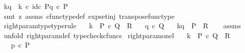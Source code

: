 \begin{isabellebody}
\ {\isachardoublequoteopen}k\isactrlbsub {\isacharbrackleft}{\kern0pt}{\isacharminus}{\kern0pt}{\isacharcomma}{\kern0pt}q{\isacharbrackright}{\kern0pt}\isactrlesub \ {\isasymequiv}\ k\ {\isasymcirc}\isactrlsub c\ {\isasymlangle}id\isactrlsub c\ P{\isacharcomma}{\kern0pt}q\ {\isasymcirc}\isactrlsub c\ {\isasymbeta}\isactrlbsub P\isactrlesub {\isasymrangle}{\isachardoublequoteclose}\isanewline
\ \ \ \ \isamarkupfalse%
\ {\isacharparenleft}{\kern0pt}smt\ {\isacharparenleft}{\kern0pt}z{}{\isacharparenright}{\kern0pt}\ assms\ cfunc{\isacharunderscore}{\kern0pt}type{\isacharunderscore}{\kern0pt}def\ exp{\isacharunderscore}{\kern0pt}set{\isacharunderscore}{\kern0pt}inj\ transpose{\isacharunderscore}{\kern0pt}func{\isacharunderscore}{\kern0pt}type{\isacharparenright}{\kern0pt}\isanewline
{}\isamarkupfalse%
%
\endisatagproof
{\isafoldproof}%
%
\isadelimproof
\isanewline
%
\endisadelimproof
\isanewline
{}\isamarkupfalse%
\ right{\isacharunderscore}{\kern0pt}param{\isacharunderscore}{\kern0pt}type{\isacharbrackleft}{\kern0pt}type{\isacharunderscore}{\kern0pt}rule{\isacharbrackright}{\kern0pt}{\isacharcolon}{\kern0pt}\isanewline
\ \ \ {\isachardoublequoteopen}k\ {\isacharcolon}{\kern0pt}\ P\ {\isasymtimes}\isactrlsub c\ Q\ {\isasymrightarrow}\ R{\isachardoublequoteclose}\isanewline
\ \ \ {\isachardoublequoteopen}q\ {\isasymin}\isactrlsub c\ Q{\isachardoublequoteclose}\isanewline
\ \ \ {\isachardoublequoteopen}k\isactrlbsub {\isacharbrackleft}{\kern0pt}{\isacharminus}{\kern0pt}{\isacharcomma}{\kern0pt}q{\isacharbrackright}{\kern0pt}\isactrlesub \ {\isacharcolon}{\kern0pt}\ P\ {\isasymrightarrow}\ R{\isachardoublequoteclose}\isanewline
%
\isadelimproof
\ \ %
\endisadelimproof
%
\isatagproof
{}\isamarkupfalse%
\ assms\ \isamarkupfalse%
\ {\isacharparenleft}{\kern0pt}unfold\ right{\isacharunderscore}{\kern0pt}param{\isacharunderscore}{\kern0pt}def{}{\isacharcomma}{\kern0pt}\ typecheck{\isacharunderscore}{\kern0pt}cfuncs{\isacharparenright}{\kern0pt}%
\endisatagproof
{\isafoldproof}%
%
\isadelimproof
\isanewline
%
\endisadelimproof
\isanewline
{}\isamarkupfalse%
\ right{\isacharunderscore}{\kern0pt}param{\isacharunderscore}{\kern0pt}on{\isacharunderscore}{\kern0pt}el{\isacharcolon}{\kern0pt}\isanewline
\ \ \ {\isachardoublequoteopen}k\ {\isacharcolon}{\kern0pt}\ P\ {\isasymtimes}\isactrlsub c\ Q\ {\isasymrightarrow}\ R{\isachardoublequoteclose}\isanewline
\ \ \ {\isachardoublequoteopen}p\ {\isasymin}\isactrlsub c\ P{\isachardoublequoteclose}\isanewline

\end{isabellebody}
